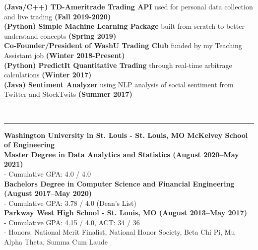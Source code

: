 \documentclass[11pt]{article}
\begin{document}
\begin{titlepage}
		\begin{addmargin}[1em]{0em}
    		\textbf{(Java/C++) TD-Ameritrade Trading API} used for personal data collection and live trading \textbf{ \hfill (Fall 2019-2020)}\\
			\textbf{(Python) Simple Machine Learning Package} built from scratch to better understand concepts \textbf{ \hfill (Spring 2019)}\\
			\textbf{Co-Founder/President of WashU Trading Club} funded by my Teaching Assistant job \textbf{\hfill (Winter 2018-Present)}\\
			\textbf{(Python) PredictIt Quantitative Trading} through real-time arbitrage calculations \textbf{\hfill (Winter 2017)}\\
            \textbf{(Java) Sentiment Analyzer} using NLP analysis of social sentiment from Twitter and StockTwits \textbf{\hfill (Summer 2017)}\\
		\end{addmargin}
		\vspace{-10pt}
		\noindent
		\\\rule{\textwidth}{0.4pt}
		\begin{addmargin}[1em]{0em}
			\textbf{Washington University in St. Louis - St. Louis, MO \hfill McKelvey School of Engineering}\\
			\textbf{Master  Degree in Data Analytics and Statistics \hfill (August 2020–May 2021)}\\
				- Cumulative GPA: 4.0 / 4.0\\
			\textbf{Bachelors Degree in Computer Science and Financial Engineering \hfill (August 2017–May 2020)}\\
				- Cumulative GPA: 3.78 / 4.0 (Dean's List)\\
			\textbf{Parkway West High School - St. Louis, MO \hfill (August 2013–May 2017)}\\
				- Cumulative GPA: 4.15 / 4.0, ACT: 34 / 36\\
				- Honors: National Merit Finalist, National Honor Society, Beta Chi Pi, Mu Alpha Theta, Summa Cum Laude \\
		\end{addmargin}
	\end{titlepage}
\end{document}

